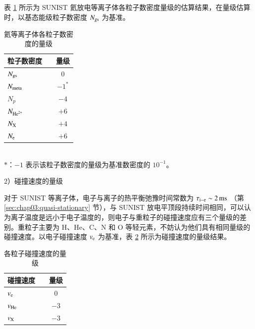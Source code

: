 表 \ref{table:chap03:N-gusuan} 所示为 SUNIST 氦放电等离子体各粒子数密度量级的估算结果，在量级估算时，以基态能级粒子数密度 $N_{\rm gs}$ 为基准。

\begin{table}%
\caption{氦等离子体各粒子数密度的量级}
\label{table:chap03:N-gusuan}
\begin{center}
\begin{tabular}{lcc}\toprule[1.5pt]
粒子数密度 & & 量级 \\
\midrule[1pt]
\hspace{1.5em}$N_{\rm gs}$ & & \hspace{0.5em}$0$ \\
\hspace{1.5em}$N_{\rm meta}$ & & \hspace{0.5em}$-1^{*}$ \\
\hspace{1.5em}$N_p$ & & $-4$ \\
\hspace{1.5em}$N_{{\rm He}^{2+}}$ & & $+6$ \\
\hspace{1.5em}$N_{\rm X}$ & & $+4$ \\
\hspace{1.5em}$N_{\rm e}$ & & $+6$\\
\bottomrule[1.5pt]
\end{tabular}\\[0.5em]
{\small$*$：$-1$ 表示该粒子数密度的量级为基准数密度的 $10^{-1}$。}
\end{center}
\end{table}

2）碰撞速度的量级

对于 SUNIST 等离子体，电子与离子的热平衡弛豫时间常数为 $\tau_{\rm i-e}\sim2\,{\rm ms}$ （第 \ref{sec:chap03:quasi-stationary} 节），与 SUNIST 放电平顶段持续时间相同，可以认为离子温度是远小于电子温度的，则电子与重粒子的碰撞速度应有三个量级的差别。重粒子主要为 H、He、C、N 和 O 等轻元素，不妨认为他们具有相同量级的碰撞速度。以电子碰撞速度 $v_{\rm e}$ 为基准，表 \ref{table:chap03:v-gusuan} 所示为碰撞速度的量级结果。

\begin{table}%
\caption{各粒子碰撞速度的量级}
\label{table:chap03:v-gusuan}
\begin{center}
\begin{tabular}{lcc}\toprule[1.5pt]
碰撞速度 & & 量级 \\
\midrule[1pt]
\hspace{1.5em}$v_{\rm e}$ & & \hspace{0.5em}$0$ \\
\hspace{1.5em}$v_{\rm He}$ & & $-3$ \\
\hspace{1.5em}$v_{\rm X}$ & & $-3$ \\
\bottomrule[1.5pt]
\end{tabular}
\end{center}
\end{table}


